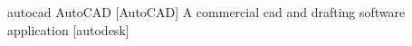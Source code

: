 \newglsXsoftware%
{autocad}%
{AutoCAD\textsuperscript{\textregistered}}%
[AutoCAD]%
{A commercial \gls{cad} and drafting software application \cite{website:Autodesk:AutoCAD}}%
[autodesk]%